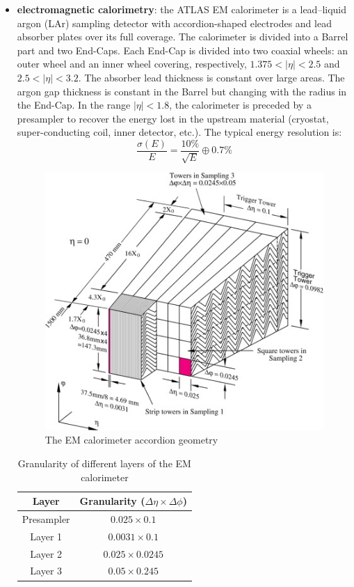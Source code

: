 \documentclass[a4paper, oneside]{book}
\begin{document}
					\begin{itemize}
						\item \textbf{electromagnetic calorimetry}:
						the ATLAS EM calorimeter is a lead–liquid argon (LAr) sampling detector with accordion-shaped electrodes and lead absorber plates over its full coverage. The calorimeter is divided into a Barrel part and two End-Caps. Each End-Cap is divided into two coaxial wheels: an outer wheel and an inner wheel covering, respectively, $1.375<|\eta|<2.5$ and $2.5<|\eta|<3.2$. The absorber lead thickness is constant over large areas. The argon gap thickness is constant in the Barrel but changing with the radius in the End-Cap.
						In the range $|\eta|<1.8$, the calorimeter is preceded by a presampler to recover the energy lost in the upstream material (cryostat, super-conducting coil, inner detector, etc.). The typical energy resolution is:
						$$ 
						\frac{\sigma(E)}{E} = \frac{10\%}{\sqrt{E}} \oplus 0.7\%
						$$
						
						\begin{figure}[h!]
							\centering
							\includegraphics[width=.6\textwidth]{tesi_images/calo_struct.jpg}
							\caption{The EM calorimeter accordion geometry}
							\label{fig:calo struct}
						\end{figure}
						\begin{table}[h!]
							\centering
							\begin{tabular}{cc}
								\toprule[1.5pt]
								\textbf{Layer} & \textbf{Granularity ($\Delta\eta \times \Delta\phi$)} \\
								\midrule
								Presampler & $0.025 \times 0.1$ \\
								Layer 1 & $0.0031 \times 0.1$ \\
								Layer 2 & $0.025 \times 0.0245$ \\
								Layer 3 & $0.05 \times 0.245$ \\
								\bottomrule[1.5pt]
							\end{tabular}
								\caption{Granularity of different layers of the EM calorimeter}\label{tab:granularity}
							

\end{table}
\end{itemize}
\end{document}
